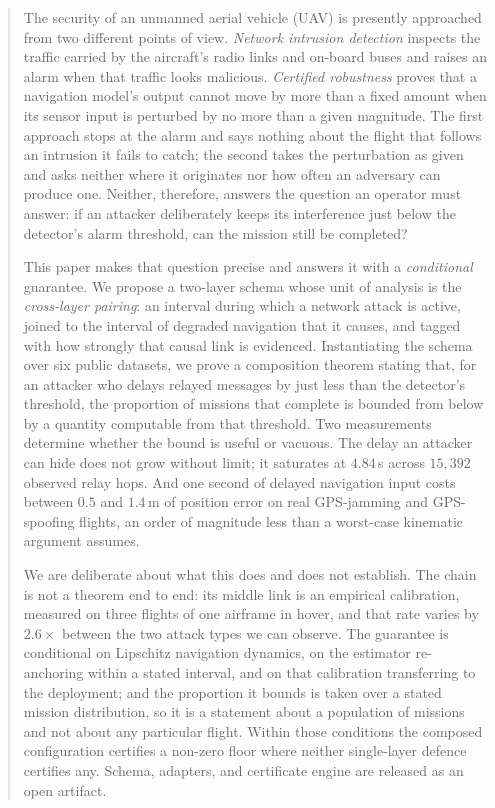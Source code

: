 \begin{abstract}
The security of an unmanned aerial vehicle (UAV) is presently approached from
two different points of view. \emph{Network intrusion detection} inspects the
traffic carried by the aircraft's radio links and on-board buses and raises an
alarm when that traffic looks malicious. \emph{Certified robustness} proves
that a navigation model's output cannot move by more than a fixed amount when
its sensor input is perturbed by no more than a given magnitude. The first
approach stops at the alarm and says nothing about the flight that follows an
intrusion it fails to catch; the second takes the perturbation as given and asks
neither where it originates nor how often an adversary can produce one. Neither,
therefore, answers the question an operator must answer: if an attacker
deliberately keeps its interference just below the detector's alarm threshold,
can the mission still be completed?

This paper makes that question precise and answers it with a
\emph{conditional} guarantee. We propose a two-layer schema whose unit of
analysis is the \emph{cross-layer pairing}: an interval during which a network
attack is active, joined to the interval of degraded navigation that it causes,
and tagged with how strongly that causal link is evidenced. Instantiating the
schema over six public datasets, we prove a composition theorem stating that,
for an attacker who delays relayed messages by just less than the detector's
threshold, the proportion of missions that complete is bounded from below by a
quantity computable from that threshold. Two measurements determine whether the
bound is useful or vacuous. The delay an attacker can hide does not grow without
limit; it saturates at $4.84$\,s across $15{,}392$ observed relay hops. And one
second of delayed navigation input costs between $0.5$ and $1.4$\,m of position
error on real GPS-jamming and GPS-spoofing flights, an order of magnitude less
than a worst-case kinematic argument assumes.

We are deliberate about what this does and does not establish. The chain is not
a theorem end to end: its middle link is an empirical calibration, measured on
three flights of one airframe in hover, and that rate varies by $2.6\times$
between the two attack types we can observe. The guarantee is conditional on
Lipschitz navigation dynamics, on the estimator re-anchoring within a stated
interval, and on that calibration transferring to the deployment; and the
proportion it bounds is taken over a stated mission distribution, so it is a
statement about a population of missions and not about any particular flight.
Within those conditions the composed configuration certifies a non-zero floor
where neither single-layer defence certifies any. Schema, adapters, and
certificate engine are released as an open artifact.
\end{abstract}

